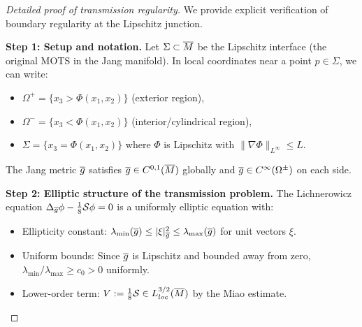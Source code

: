 \begin{proof}[Detailed proof of transmission regularity]
We provide explicit verification of boundary regularity at the Lipschitz junction.

\textbf{Step 1: Setup and notation.}
Let $\Sigma \subset \overline{M}$ be the Lipschitz interface (the original MOTS in the Jang manifold). In local coordinates near a point $p \in \Sigma$, we can write:
\begin{itemize}
    \item $\Omega^+ = \{x_3 > \Phi(x_1, x_2)\}$ (exterior region),
    \item $\Omega^- = \{x_3 < \Phi(x_1, x_2)\}$ (interior/cylindrical region),
    \item $\Sigma = \{x_3 = \Phi(x_1, x_2)\}$ where $\Phi$ is Lipschitz with $\|\nabla \Phi\|_{L^\infty} \le L$.
\end{itemize}

The Jang metric $\overline{g}$ satisfies $\overline{g} \in C^{0,1}(\overline{M})$ globally and $\overline{g} \in C^\infty(\Omega^\pm)$ on each side.

\textbf{Step 2: Elliptic structure of the transmission problem.}
The Lichnerowicz equation $\Delta_{\overline{g}} \phi - \frac{1}{8} \mathcal{S} \phi = 0$ is a uniformly elliptic equation with:
\begin{itemize}
    \item Ellipticity constant: $\lambda_{\min}(\overline{g}) \le |\xi|^2_{\overline{g}} \le \lambda_{\max}(\overline{g})$ for unit vectors $\xi$.
    \item Uniform bounds: Since $\overline{g}$ is Lipschitz and bounded away from zero, $\lambda_{\min}/\lambda_{\max} \ge c_0 > 0$ uniformly.
    \item Lower-order term: $V := \frac{1}{8}\mathcal{S} \in L^{3/2}_{loc}(\overline{M})$ by the Miao estimate.
\end{itemize}


\end{proof}
